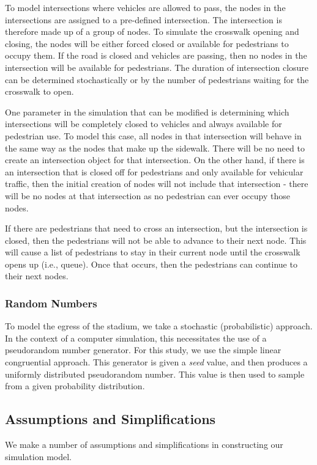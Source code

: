 \documentclass[12pt]{article}
\begin{document}
To model intersections where vehicles are allowed to pass, the nodes in the intersections are assigned to a pre-defined intersection.  The intersection is therefore made up of a group of nodes.  To simulate the crosswalk opening and closing, the nodes will be either forced closed or available for pedestrians to occupy them.  If the road is closed and vehicles are passing, then no nodes in the intersection will be available for pedestrians.  The duration of intersection closure can be determined stochastically or by the number of pedestrians waiting for the crosswalk to open.

One parameter in the simulation that can be modified is determining which intersections will be completely closed to vehicles and always available for pedestrian use.  To model this case, all nodes in that intersection will behave in the same way as the nodes that make up the sidewalk.  There will be no need to create an intersection object for that intersection.  On the other hand, if there is an intersection that is closed off for pedestrians and only available for vehicular traffic, then the initial creation of nodes will not include that intersection - there will be no nodes at that intersection as no pedestrian can ever occupy those nodes.

If there are pedestrians that need to cross an intersection, but the intersection is closed, then the pedestrians will not be able to advance to their next node.  This will cause a list of pedestrians to stay in their current node until the crosswalk opens up (i.e., queue).  Once that occurs, then the pedestrians can continue to their next nodes.

\subsubsection{Random Numbers}
To model the egress of the stadium, we take a stochastic (probabilistic)
approach. In the context of a computer simulation, this necessitates the use of
a pseudorandom number generator. For this study, we use the simple linear
congruential approach. This generator is given a \textit{seed} value,
and then produces a uniformly distributed pseudorandom number. This value is
then used to sample from a given probability distribution.

\subsection{Assumptions and Simplifications}
We make a number of assumptions and simplifications in constructing our
simulation model.
\end{document}

